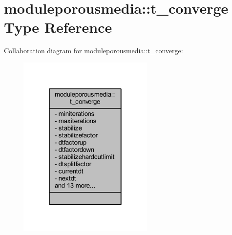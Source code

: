 \hypertarget{structmoduleporousmedia_1_1t__converge}{}\section{moduleporousmedia\+:\+:t\+\_\+converge Type Reference}
\label{structmoduleporousmedia_1_1t__converge}


Collaboration diagram for moduleporousmedia\+:\+:t\+\_\+converge\+:\nopagebreak
\begin{figure}[H]
\begin{center}
\leavevmode
\includegraphics[width=190pt]{structmoduleporousmedia_1_1t__converge__coll__graph}
\end{center}
\end{figure}
